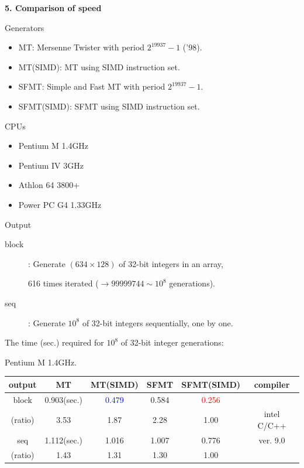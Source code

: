 \documentclass[a4j,12pt,landscape]{jarticle}
\begin{document}
\newpage
\noindent
{\bf 5. Comparison of speed}
\begin{description}
  \item Generators
    \begin{itemize}
    \item MT: Mersenne Twister with period $2^{19937}-1$ ('98).
    \item MT(SIMD): MT using SIMD instruction set.
    \item SFMT: Simple and Fast MT with period $2^{19937}-1$.
    \item SFMT(SIMD): SFMT using SIMD instruction set.
    \end{itemize}
  \item CPUs
    \begin{itemize}
      \item Pentium M 1.4GHz
      \item Pentium IV 3GHz
      \item Athlon 64 3800+
      \item Power PC G4 1.33GHz  
    \end{itemize}
    \newpage
    \item Output
      \begin{description}
      \item[block]: Generate $(634 \times 128)$ of 32-bit integers 
        in an array,
        
        616 times iterated ($\to 99999744\sim 10^8$ generations).
      \item[seq]: Generate $10^8$ of 32-bit integers sequentially,
        one by one.
      \end{description}
    \end{description}

\newpage
\begin{center}
The time (sec.) required for $10^8$ 
of 32-bit integer generations:

Pentium M 1.4GHz. 

\vskip 2mm
\begin{tabular}{|c||c|c|c|c|c|}
\hline
output & MT & MT{\Large(SIMD)} & SFMT & SFMT{\Large (SIMD)} & compiler
 \\ \hline \hline
 block   & 0.903(sec.) & \textcolor{blue}{0.479}
 & 0.584 & \textcolor{red}{0.256} &    \\ \cline{2-5}
 (ratio) & 3.53\phantom{0}  & 1.87\phantom{0}  & 2.28\phantom{0}  & 1.00\phantom{0}  & intel C/C++ \\ \cline{1-5}
 seq     & 1.112(sec.) & 1.016 & 1.007 & 0.776 & ver. 9.0\\ \cline{2-5}
 (ratio) & 1.43\phantom{0} & 1.31\phantom{0}  & 1.30\phantom{0}  & 1.00\phantom{0}  &  \\ \hline
\end{tabular}
\end{center}
\end{document}
